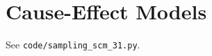 
\chapter{Cause-Effect Models}

\begin{problem}{1}
See \texttt{code/sampling\_scm\_31.py}.
\end{problem}

\begin{problem}{2}

\end{problem}

\begin{problem}{3}

\end{problem}

\begin{problem}{4}

\end{problem}

